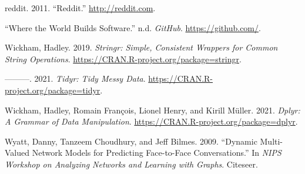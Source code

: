 \documentclass[
]{article}
\newlength{\cslhangindent}
\newlength{\cslentryspacingunit} %
\newenvironment{CSLReferences}[2] %
 {%
  \setlength{\parindent}{0pt}
  \ifodd #1
  \let\oldpar\par
  \def\par{\hangindent=\cslhangindent\oldpar}
  \fi
  \setlength{\parskip}{#2\cslentryspacingunit}
 }%
 {}
\begin{document}
\begin{CSLReferences}{1}{0}
\leavevmode{}%
reddit. 2011. {``Reddit.''} \url{http://reddit.com}.

\leavevmode{}%
{``Where the World Builds Software.''} n.d. \emph{GitHub}. \url{https://github.com/}.

\leavevmode{}%
Wickham, Hadley. 2019. \emph{Stringr: Simple, Consistent Wrappers for Common String Operations}. \url{https://CRAN.R-project.org/package=stringr}.

\leavevmode{}%
---------. 2021. \emph{Tidyr: Tidy Messy Data}. \url{https://CRAN.R-project.org/package=tidyr}.

\leavevmode{}%
Wickham, Hadley, Romain François, Lionel Henry, and Kirill Müller. 2021. \emph{Dplyr: A Grammar of Data Manipulation}. \url{https://CRAN.R-project.org/package=dplyr}.

\leavevmode{}%
Wyatt, Danny, Tanzeem Choudhury, and Jeff Bilmes. 2009. {``Dynamic Multi-Valued Network Models for Predicting Face-to-Face Conversations.''} In \emph{NIPS Workshop on Analyzing Networks and Learning with Graphs}. Citeseer.

\end{CSLReferences}
\end{document}
